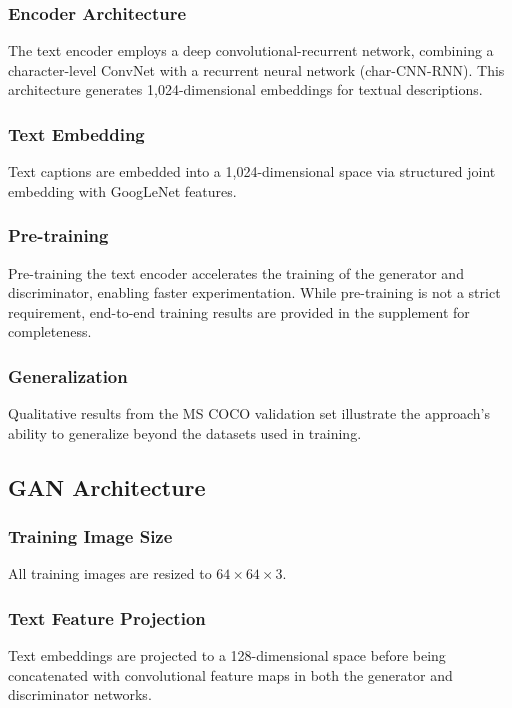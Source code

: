 \subsubsection*{Encoder Architecture}
The text encoder employs a deep convolutional-recurrent network, combining a character-level ConvNet with a recurrent neural network (char-CNN-RNN). This architecture generates 1,024-dimensional embeddings for textual descriptions.

\subsubsection*{Text Embedding}
Text captions are embedded into a 1,024-dimensional space via structured joint embedding with GoogLeNet features. 

\subsubsection*{Pre-training}
Pre-training the text encoder accelerates the training of the generator and discriminator, enabling faster experimentation. While pre-training is not a strict requirement, end-to-end training results are provided in the supplement for completeness.

\subsubsection*{Generalization}
Qualitative results from the MS COCO validation set illustrate the approach's ability to generalize beyond the datasets used in training.

\subsection*{GAN Architecture}

\subsubsection*{Training Image Size}
All training images are resized to \(64 \times 64 \times 3\).

\subsubsection*{Text Feature Projection}
Text embeddings are projected to a 128-dimensional space before being concatenated with convolutional feature maps in both the generator and discriminator networks.

